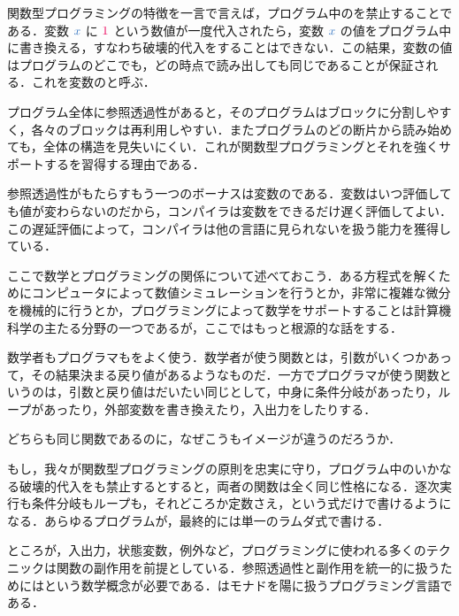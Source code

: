 \documentclass[a5paper,twoside,fleqn,draft]{jsbook}
\begin{document}
関数型プログラミングの特徴を一言で言えば，プログラム中のを禁止することである．変数 $\hVar{x}$ に $\hConstant{1}$ という数値が一度代入されたら，変数 $\hVar{x}$ の値をプログラム中に書き換える，すなわち破壊的代入をすることはできない．この結果，変数の値はプログラムのどこでも，どの時点で読み出しても同じであることが保証される．これを変数のと呼ぶ．

プログラム全体に参照透過性があると，そのプログラムはブロックに分割しやすく，各々のブロックは再利用しやすい．またプログラムのどの断片から読み始めても，全体の構造を見失いにくい．これが関数型プログラミングとそれを強くサポートする\haskell を習得する理由である．

参照透過性がもたらすもう一つのボーナスは変数のである．変数はいつ評価しても値が変わらないのだから，コンパイラは変数をできるだけ遅く評価してよい．この遅延評価によって，\haskell コンパイラは他の言語に見られないを扱う能力を獲得している．

\separator

ここで数学とプログラミングの関係について述べておこう．ある方程式を解くためにコンピュータによって数値シミュレーションを行うとか，非常に複雑な微分を機械的に行うとか，プログラミングによって数学をサポートすることは計算機科学の主たる分野の一つであるが，ここではもっと根源的な話をする．

数学者もプログラマもをよく使う．数学者が使う関数とは，引数がいくつかあって，その結果決まる戻り値があるようなものだ．一方でプログラマが使う関数というのは，引数と戻り値はだいたい同じとして，中身に条件分岐があったり，ループがあったり，外部変数を書き換えたり，入出力をしたりする．

どちらも同じ関数であるのに，なぜこうもイメージが違うのだろうか．

もし，我々が関数型プログラミングの原則を忠実に守り，プログラム中のいかなる破壊的代入をも禁止するとすると，両者の関数は全く同じ性格になる．逐次実行も条件分岐もループも，それどころか定数さえ，という式だけで書けるようになる．あらゆるプログラムが，最終的には単一のラムダ式で書ける．

ところが，入出力，状態変数，例外など，プログラミングに使われる多くのテクニックは関数の副作用を前提としている．参照透過性と副作用を統一的に扱うためにはという数学概念が必要である．\haskell はモナドを陽に扱うプログラミング言語である．


\end{document}
